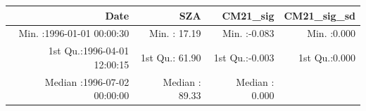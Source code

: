 \documentclass[
  10pt,
  a4paper,oneside]{article}
\begin{document}
\begin{longtable}[]{@{}rrrr@{}}
\toprule
\begin{minipage}[b]{0.33\columnwidth}\raggedleft
Date\strut
\end{minipage} & \begin{minipage}[b]{0.19\columnwidth}\raggedleft
SZA\strut
\end{minipage} & \begin{minipage}[b]{0.19\columnwidth}\raggedleft
CM21\_sig\strut
\end{minipage} & \begin{minipage}[b]{0.19\columnwidth}\raggedleft
CM21\_sig\_sd\strut
\end{minipage}\tabularnewline
\midrule
\endhead
\begin{minipage}[t]{0.33\columnwidth}\raggedleft
Min. :1996-01-01 00:00:30\strut
\end{minipage} & \begin{minipage}[t]{0.19\columnwidth}\raggedleft
Min. : 17.19\strut
\end{minipage} & \begin{minipage}[t]{0.19\columnwidth}\raggedleft
Min. :-0.083\strut
\end{minipage} & \begin{minipage}[t]{0.19\columnwidth}\raggedleft
Min. :0.000\strut
\end{minipage}\tabularnewline
\begin{minipage}[t]{0.33\columnwidth}\raggedleft
1st Qu.:1996-04-01 12:00:15\strut
\end{minipage} & \begin{minipage}[t]{0.19\columnwidth}\raggedleft
1st Qu.: 61.90\strut
\end{minipage} & \begin{minipage}[t]{0.19\columnwidth}\raggedleft
1st Qu.:-0.003\strut
\end{minipage} & \begin{minipage}[t]{0.19\columnwidth}\raggedleft
1st Qu.:0.000\strut
\end{minipage}\tabularnewline
\begin{minipage}[t]{0.33\columnwidth}\raggedleft
Median :1996-07-02 00:00:00\strut
\end{minipage} & \begin{minipage}[t]{0.19\columnwidth}\raggedleft
Median : 89.33\strut
\end{minipage} & \begin{minipage}[t]{0.19\columnwidth}\raggedleft
Median : 0.000\strut
\end{minipage} & \begin{minipage}[t]{0.19\columnwidth}\raggedleft

\end{minipage}
\end{longtable}
\end{document}
